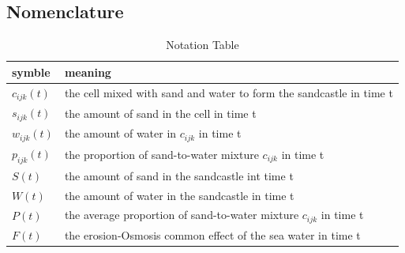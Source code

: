 \documentclass[12pt]{article}
\begin{document}
\subsection{Nomenclature}
\begin{table}[H]
    \caption{Notation Table}
    \vspace{10pt}
    \centering
    \begin{tabular}{ |l| p{5cm}| }
        \hline
        symble & meaning \\
        \hline
        $c_{ijk}(t)$		&the cell mixed with sand and water to form the sandcastle in time t	    \\
        $s_{ijk}(t)$		&the amount of sand in the cell in time t						            \\
        $w_{ijk}(t)$		&the amount of water in  $c_{ijk}$ in time t						        \\
        $p_{ijk}(t)$		&the proportion of sand-to-water mixture $c_{ijk}$ in time t		        \\
        $S(t)$			    &the amount of sand in the sandcastle	int time t					        \\
        $W(t)$			    &the amount of water in the sandcastle in time t					        \\
		$P(t)$			    &the average proportion of sand-to-water mixture $c_{ijk}$ in time t        \\
		$F(t)$			    &the erosion-Osmosis common effect of the sea water in time t        		\\
        \hline       
    \end{tabular}
    \label{bs1}
\end{table}
\end{document}
